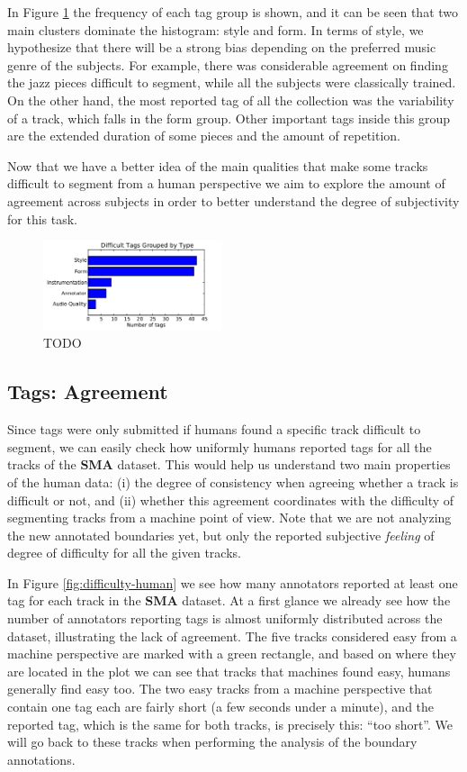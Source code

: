 \documentclass{article}
\begin{document}
In Figure \ref{fig:difficult-tags-type} the frequency of each tag group is shown, and it can be seen that two main clusters dominate the histogram: style and form.
In terms of style, we hypothesize that there will be a strong bias depending on the preferred music genre of the subjects.
For example, there was considerable agreement on finding the jazz pieces difficult to segment, while all the subjects were classically trained.
On the other hand, the most reported tag of all the collection was the variability of a track, which falls in the form group.
Other important tags inside this group are the extended duration of some pieces and the amount of repetition.

Now that we have a better idea of the main qualities that make some tracks difficult to segment from a human perspective we aim to explore the amount of agreement across subjects in order to better understand the degree of subjectivity for this task.


\begin{figure}
  \centering
  \includegraphics[width=0.47\textwidth]{plots/difficult-tags-type.pdf}
  \caption{TODO}
  \label{fig:difficult-tags-type}
\end{figure}%

\subsection{Tags: Agreement}

Since tags were only submitted if humans found a specific track difficult to segment, we can easily check how uniformly humans reported tags for all the tracks of the \textbf{SMA} dataset.
This would help us understand two main properties of the human data: (i) the degree of consistency when agreeing whether a track is difficult or not, and (ii) whether this agreement coordinates with the difficulty of segmenting tracks from a machine point of view.
Note that we are not analyzing the new annotated boundaries yet, but only the reported subjective \textit{feeling} of degree of difficulty for all the given tracks.

In Figure \ref{fig:difficulty-human} we see how many annotators reported at least one tag for each track in the \textbf{SMA} dataset.
At a first glance we already see how the number of annotators reporting tags is almost uniformly distributed across the dataset, illustrating the lack of agreement. 
The five tracks considered easy from a machine perspective are marked with a green rectangle, and based on where they are located in the plot we can see that tracks that machines found easy, humans generally find easy too.
The two easy tracks from a machine perspective that contain one tag each are fairly short (a few seconds under a minute), and the reported tag, which is the same for both tracks, is precisely this: ``too short''.
We will go back to these tracks when performing the analysis of the boundary annotations.
\end{document}
